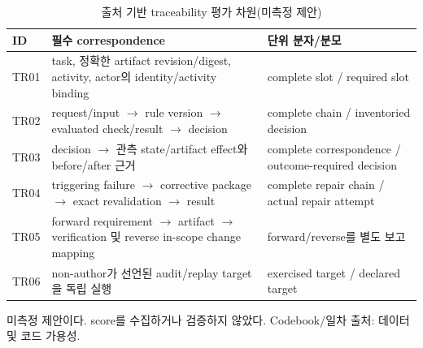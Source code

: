 \documentclass[journal]{IEEEtran}
\begin{document}
\begin{table}[t]
\caption{출처 기반 traceability 평가 차원(미측정 제안)}
\label{tab:traceability-rubric}
\centering
\footnotesize
\setlength{\tabcolsep}{4pt}
\begin{tabularx}{\columnwidth}{@{}l>{\raggedright\arraybackslash}X>{\raggedright\arraybackslash}p{}@{}}
\toprule
\textbf{ID} & \textbf{필수 correspondence} & \textbf{단위 분자/분모} \\
\midrule
TR01 & task, 정확한 artifact revision/digest, activity, actor의 identity/activity binding & complete slot / required slot \\
TR02 & request/input $\rightarrow$ rule version $\rightarrow$ evaluated check/result $\rightarrow$ decision & complete chain / inventoried decision \\
TR03 & decision $\rightarrow$ 관측 state/artifact effect와 before/after 근거 & complete correspondence / outcome-required decision \\
TR04 & triggering failure $\rightarrow$ corrective package $\rightarrow$ exact revalidation $\rightarrow$ result & complete repair chain / actual repair attempt \\
TR05 & forward requirement $\rightarrow$ artifact $\rightarrow$ verification 및 reverse in-scope change mapping & forward/reverse를 별도 보고 \\
TR06 & non-author가 선언된 audit/replay target을 독립 실행 & exercised target / declared target \\
\bottomrule
\end{tabularx}
\par\vspace{2pt}\noindent\parbox{0.96\columnwidth}{\footnotesize 미측정 제안이다. score를 수집하거나 검증하지 않았다. Codebook/일차 출처: 데이터 및 코드 가용성.}
\end{table}
\end{document}
